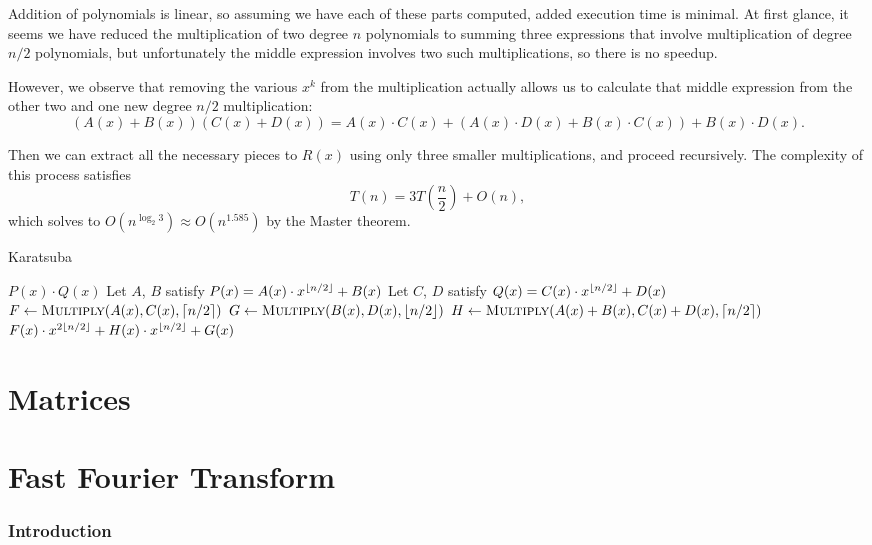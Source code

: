 Addition of polynomials is linear, so assuming we have each of these parts computed, 
added execution time is minimal. At first glance, it seems we have reduced the multiplication
of two degree $n$ polynomials to summing three expressions that involve multiplication
of degree $n/2$ polynomials, but unfortunately the middle expression involves two such
multiplications, so there is no speedup.

However, we observe that removing the various $x^k$ from the multiplication actually
allows us to calculate that middle expression from the other two and one new 
degree $n/2$ multiplication:
\[
(A(x) + B(x))(C(x) + D(x)) = A(x) \cdot C(x) + (A(x) \cdot D(x) + B(x) \cdot C(x)) + B(x) \cdot D(x).
\]

Then we can extract all the necessary pieces to $R(x)$ using only three smaller 
multiplications, and proceed recursively. The complexity of this process satisfies
\[T(n) = 3 T\left(\frac{n}{2}\right) + O(n),\]
which solves to $O(n^{\log_2{3}}) \approx O(n^{1.585})$ by the Master theorem.

\begin{algorithm}[H]
\caption{Karatsuba}
\begin{algorithmic}
		\State \Return $P(x) \cdot Q(x)$ 
	\EndIf
	\State Let $A$, $B$ satisfy $P(x) = A(x) \cdot x^{\left\lfloor n/2 \right\rfloor} + B(x)$
	\State Let $C$, $D$ satisfy $Q(x) = C(x) \cdot x^{\left\lfloor n/2 \right\rfloor} + D(x)$
	\State $F \gets \Call{Multiply}{A(x), C(x), \ceiling{n/2}}$
	\State $G \gets \Call{Multiply}{B(x), D(x), \floor{n/2}}$
	\State $H \gets \Call{Multiply}{A(x) + B(x), C(x) + D(x), \ceiling{n/2}}$
	\State \Return $F(x) \cdot x^{2 \left\lfloor n/2 \right\rfloor} + H(x) \cdot x^{\left\lfloor n/2 \right\rfloor} + G(x)$
\EndFunction
\end{algorithmic}
\end{algorithm}

\section{Matrices}

\section{Fast Fourier Transform}

\subsubsection{Introduction}

